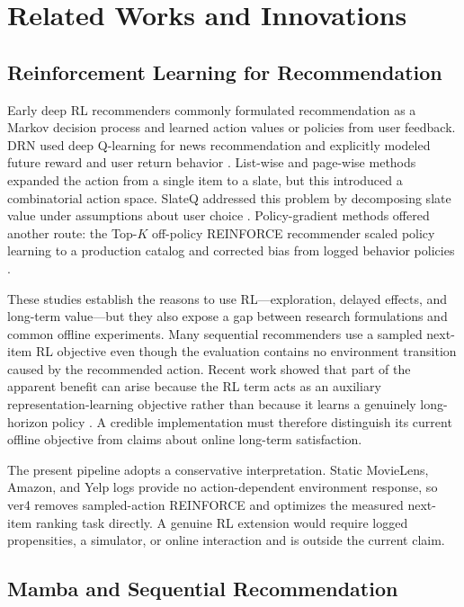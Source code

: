 \documentclass[11pt,a4paper]{article}
\begin{document}
\section{Related Works and Innovations}

\subsection{Reinforcement Learning for Recommendation}

Early deep RL recommenders commonly formulated recommendation as a Markov decision process and learned action values or policies from user feedback. DRN used deep Q-learning for news recommendation and explicitly modeled future reward and user return behavior \cite{DRN}. List-wise and page-wise methods expanded the action from a single item to a slate, but this introduced a combinatorial action space. SlateQ addressed this problem by decomposing slate value under assumptions about user choice \cite{SLATEQ}. Policy-gradient methods offered another route: the Top-$K$ off-policy REINFORCE recommender scaled policy learning to a production catalog and corrected bias from logged behavior policies \cite{TOPKREINFORCE}.

These studies establish the reasons to use RL---exploration, delayed effects, and long-term value---but they also expose a gap between research formulations and common offline experiments. Many sequential recommenders use a sampled next-item RL objective even though the evaluation contains no environment transition caused by the recommended action. Recent work showed that part of the apparent benefit can arise because the RL term acts as an auxiliary representation-learning objective rather than because it learns a genuinely long-horizon policy \cite{UNEXPECTEDRL}. A credible implementation must therefore distinguish its current offline objective from claims about online long-term satisfaction.

The present pipeline adopts a conservative interpretation. Static MovieLens,
Amazon, and Yelp logs provide no action-dependent environment response, so
ver4 removes sampled-action REINFORCE and optimizes the measured next-item
ranking task directly. A genuine RL extension would require logged propensities,
a simulator, or online interaction and is outside the current claim.

\subsection{Mamba and Sequential Recommendation}
\end{document}
